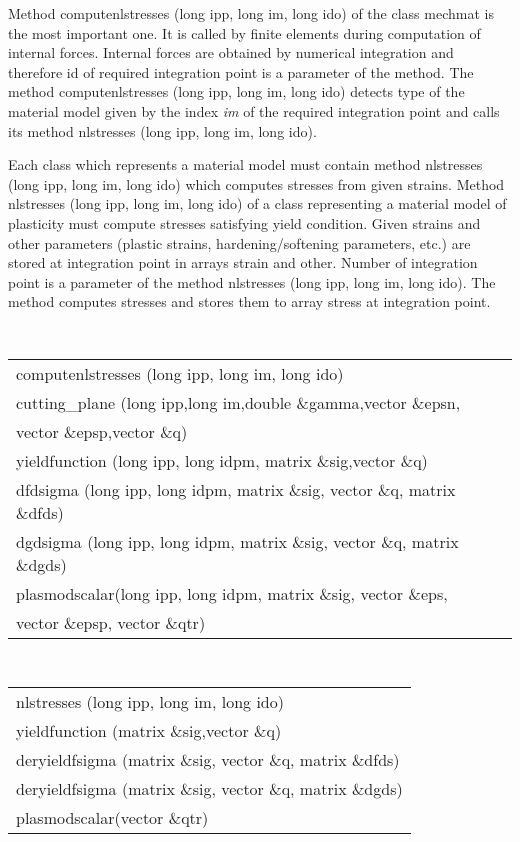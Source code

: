 Method {\sf computenlstresses (long ipp, long im, long ido)} of the class {\sf mechmat} is the most important one.
It is called by finite elements during computation of internal forces. Internal forces are obtained by numerical
integration and therefore id of required integration point is a parameter of the method. The method
{\sf computenlstresses (long ipp, long im, long ido)} detects type of the material model given by the index {\it im} of
the required integration point and calls its method {\sf nlstresses (long ipp, long im, long ido)}.

Each class which represents a material model must contain method {\sf nlstresses (long ipp, long im, long ido)} which computes
stresses from given strains.
Method {\sf nlstresses (long ipp, long im, long ido)} of a class representing a material model of plasticity must compute
stresses satisfying yield condition. Given strains and other parameters (plastic strains, hardening/softening parameters, etc.)
are stored at integration point in arrays {\sf strain} and {\sf other}. Number of integration point is a parameter of the
method {\sf nlstresses (long ipp, long im, long ido)}. The method computes stresses and stores them to array {\sf stress} at integration
point.
\begin{center}
{\tt
\begin{tabular}{l}
computenlstresses (long ipp, long im, long ido)
\\
cutting\_plane (long ipp,long im,double \&gamma,vector \&epsn,
\\
vector \&epsp,vector \&q)
\\
yieldfunction (long ipp, long idpm, matrix \&sig,vector \&q)
\\
dfdsigma (long ipp, long idpm, matrix \&sig, vector \&q, matrix \&dfds)
\\
dgdsigma (long ipp, long idpm, matrix \&sig, vector \&q, matrix \&dgds)
\\
plasmodscalar(long ipp, long idpm, matrix \&sig, vector \&eps,
\\
vector \&epsp, vector \&qtr)
\\
\end{tabular}
}
\end{center}

{\tt
\begin{tabular}{l}
nlstresses (long ipp, long im, long ido)
\\
yieldfunction (matrix \&sig,vector \&q)
\\
deryieldfsigma (matrix \&sig, vector \&q, matrix \&dfds)
\\
deryieldfsigma (matrix \&sig, vector \&q, matrix \&dgds)
\\
plasmodscalar(vector \&qtr)
\\
\end{tabular}
}
